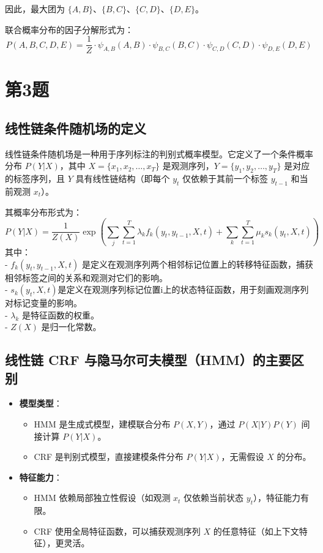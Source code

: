 \documentclass{article}
\begin{document}
因此，最大团为 \( \{A, B\} \)、\( \{B, C\} \)、\( \{C, D\} \)、\( \{D, E\} \)。

联合概率分布的因子分解形式为：
\[
P(A, B, C, D, E) = \frac{1}{Z} \cdot \psi_{A,B}(A, B) \cdot \psi_{B,C}(B, C) \cdot \psi_{C,D}(C, D) \cdot \psi_{D,E}(D, E)
\]

\section*{第3题}


\subsection*{线性链条件随机场的定义}

线性链条件随机场是一种用于序列标注的判别式概率模型。它定义了一个条件概率分布 \( P(Y|X) \)，其中 \( X = \{x_1, x_2, \dots, x_T\} \) 是观测序列，\( Y = \{y_1, y_2, \dots, y_T\} \) 是对应的标签序列，且 \( Y \) 具有线性链结构（即每个 \( y_t \) 仅依赖于其前一个标签 \( y_{t-1} \) 和当前观测 \( x_t \)）。

其概率分布形式为：
\[
P(Y|X) = \frac{1}{Z(X)} \exp \left(\sum_{j} \sum_{t=1}^T \lambda_k f_k(y_t, y_{t-1}, X, t) +\sum_{k}\sum_{t=1}^{T}\mu_ks_k(y_{t},X,t)\right)
\]
其中：\\
- \( f_k(y_t, y_{t-1}, X, t) \) 是定义在观测序列两个相邻标记位置上的转移特征函数，捕获相邻标签之间的关系和观测对它们的影响。\\
- \(s_k(y_{t},X,t)\)是定义在观测序列标记位置i上的状态特征函数，用于刻画观测序列对标记变量的影响。\\
- \( \lambda_k \) 是特征函数的权重。\\
- \( Z(X) \) 是归一化常数。\\

\subsection*{线性链 CRF 与隐马尔可夫模型（HMM）的主要区别}

\begin{itemize}
    \item \textbf{模型类型}：
    \begin{itemize}
        \item HMM 是生成式模型，建模联合分布 \( P(X, Y) \)，通过 \( P(X|Y)P(Y) \) 间接计算 \( P(Y|X) \)。
        \item CRF 是判别式模型，直接建模条件分布 \( P(Y|X) \)，无需假设 \( X \) 的分布。
    \end{itemize}
    \item \textbf{特征能力}：
    \begin{itemize}
        \item HMM 依赖局部独立性假设（如观测 \( x_t \) 仅依赖当前状态 \( y_t \)），特征能力有限。
        \item CRF 使用全局特征函数，可以捕获观测序列 \( X \) 的任意特征（如上下文特征），更灵活。
    \end{itemize}
\end{itemize}
\end{document}
